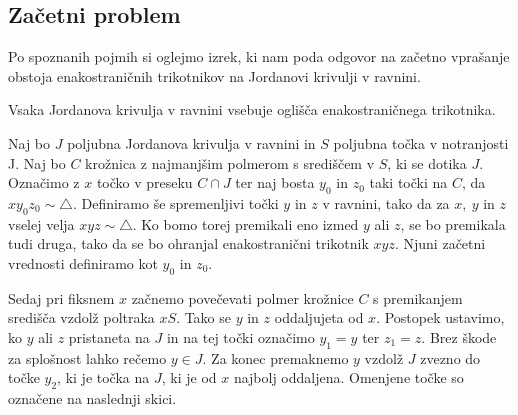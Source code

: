 \documentclass[mat1]{fmfdelo}
\begin{document}
\subsection{Začetni problem}
Po spoznanih pojmih si oglejmo izrek, ki nam poda odgovor na začetno vprašanje obstoja enakostraničnih trikotnikov na Jordanovi krivulji v ravnini.
\begin{izrek}\label{izr:zacetni}
Vsaka Jordanova krivulja v ravnini vsebuje oglišča enakostraničnega trikotnika.
\end{izrek}
\proof
Naj bo $J$ poljubna Jordanova krivulja v ravnini in $S$ poljubna točka v notranjosti J. Naj bo $C$ krožnica z najmanjšim polmerom s središčem v $S$, ki se dotika $J$. Označimo z $x$ točko v preseku $C \cap J$ ter naj bosta $y_0$ in $z_0$ taki točki na $C$, da $xy_0z_0 \sim \triangle$. Definiramo še spremenljivi točki $y$ in $z$ v ravnini, tako da za $x,\ y$ in $z$ vselej velja $xyz \sim \triangle$. Ko bomo torej premikali eno izmed $y$ ali $z$, se bo premikala tudi druga, tako da se bo ohranjal enakostranični trikotnik $xyz$. Njuni začetni vrednosti definiramo kot $y_0$ in $z_0$.

Sedaj pri fiksnem $x$ začnemo povečevati polmer krožnice $C$ s premikanjem središča vzdolž poltraka $xS$. Tako se $y$ in $z$ oddaljujeta od $x$. Postopek ustavimo, ko $y$ ali $z$ pristaneta na $J$ in na tej točki označimo $y_1 = y$ ter $z_1 = z$. Brez škode za splošnost lahko rečemo $y \in J$. Za konec premaknemo $y$ vzdolž $J$ zvezno do točke $y_2$, ki je točka na $J$, ki je od $x$ najbolj oddaljena. Omenjene točke so označene na naslednji skici.

\begin{center}
\end{center}
\end{document}
